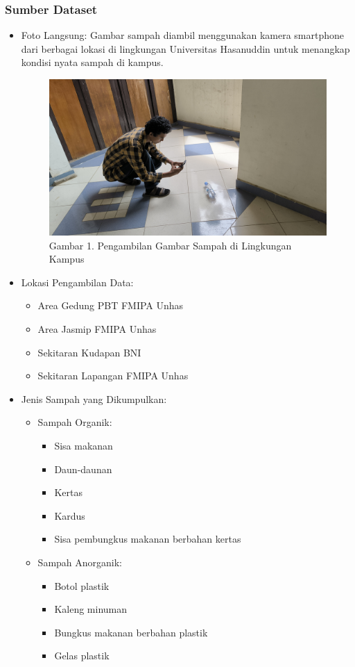 \documentclass[12pt,a4paper]{article}
\begin{document}
\subsubsection{Sumber Dataset}
\begin{itemize}
    \item Foto Langsung: Gambar sampah diambil menggunakan kamera smartphone dari berbagai lokasi di lingkungan Universitas Hasanuddin untuk menangkap kondisi nyata sampah di kampus.
    \begin{figure}[h]
        \centering
        \includegraphics[width=0.6\linewidth]{Images/fotodataset.jpg}
        \caption*{Gambar 1. Pengambilan Gambar Sampah di Lingkungan Kampus}
        \label{fig:dataset_collection}
    \end{figure}
    
    \item Lokasi Pengambilan Data:
    \begin{itemize}
        \item Area Gedung PBT FMIPA Unhas
        \item Area Jasmip FMIPA Unhas
        \item Sekitaran Kudapan BNI
        \item Sekitaran Lapangan FMIPA Unhas
        
    \end{itemize}
    
    \item Jenis Sampah yang Dikumpulkan:
    \begin{itemize}
        \item Sampah Organik:
        \begin{itemize}
            \item Sisa makanan
            \item Daun-daunan
            \item Kertas
            \item Kardus
            \item Sisa pembungkus makanan berbahan kertas
        \end{itemize}
        \item Sampah Anorganik:
        \begin{itemize}
            \item Botol plastik
            \item Kaleng minuman
            \item Bungkus makanan berbahan plastik
            \item Gelas plastik
            
        \end{itemize}
    \end{itemize}
\end{itemize}
\end{document}
